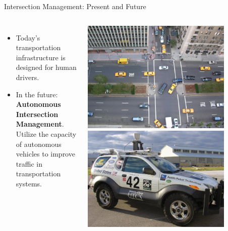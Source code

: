 \documentclass{beamer}
\begin{document}
\begin{frame}{Intersection Management: Present and Future}
\begin{columns}[c]
		\begin{itemize}
		\item Today's transportation infrastructure is designed for
		human drivers.
		\item In the future: \textbf{Autonomous Intersection
		Management}.\\
		Utilize the capacity of autonomous vehicles to improve traffic
		in transportation systems.
		\end{itemize}
		
		\includegraphics[width=0.8\textwidth]{intersection.jpg}
		\hfill
		\includegraphics[width=0.8\textwidth]{42.png}
\end{columns}
\end{frame}
\end{document}
